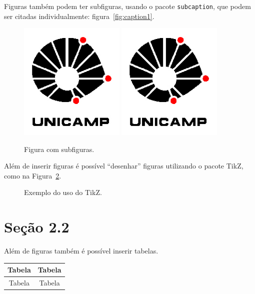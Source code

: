 Figuras também podem ter subfiguras, usando o pacote \texttt{subcaption}, que 
podem ser citadas individualmente: figura~\ref{fig:caption1}.
\begin{figure}[!htb]
    \centering
        {\includegraphics[width=0.45\textwidth]{figuras/unicamp-logo.jpg}}
    \qquad
        {\includegraphics[width=0.45\textwidth]{figuras/unicamp-logo.jpg}}
    \caption{Figura com subfiguras.}
    \label{fig:subfig}
\end{figure}

Além de inserir figuras é possível ``desenhar'' figuras
utilizando o pacote TikZ, como na Figura~\ref{fig:exem_tikz}.
\begin{figure}[!htb]
\centering
{}
\caption{Exemplo do uso do TikZ.}
\label{fig:exem_tikz}
\end{figure}

\section{Seção 2.2}
Além de figuras também é possível inserir tabelas. \\
\begin{tabular}{|c|c|}
\hline
Tabela & Tabela \\ \hline
Tabela & Tabela \\ \hline
\end{tabular}

